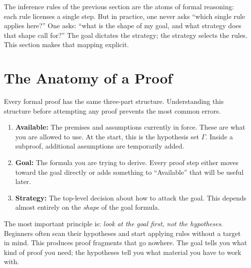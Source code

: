 The inference rules of the previous section are the atoms of formal reasoning:
each rule licenses a single step. But in practice, one never asks ``which
single rule applies here?'' One asks: ``what is the shape of my goal, and what
strategy does that shape call for?'' The goal dictates the strategy; the
strategy selects the rules. This section makes that mapping explicit.


\section*{The Anatomy of a Proof}

Every formal proof has the same three-part structure. Understanding this
structure before attempting any proof prevents the most common errors.

\begin{tcolorbox}[colback=propbox, colframe=propborder, arc=2pt,
  left=6pt, right=6pt, top=4pt, bottom=4pt,
  title={\small\textbf{The Three-Part Structure of a Proof}},
  fonttitle=\small\bfseries]
\begin{enumerate}[label=(\roman*)]
\item \textbf{Available:} The premises and assumptions currently in force.
  These are what you are allowed to use. At the start, this is the hypothesis
  set $\Gamma$. Inside a subproof, additional assumptions are temporarily added.
\item \textbf{Goal:} The formula you are trying to derive. Every proof step
  either moves toward the goal directly or adds something to ``Available'' that
  will be useful later.
\item \textbf{Strategy:} The top-level decision about how to attack the goal.
  This depends almost entirely on the \emph{shape} of the goal formula.
\end{enumerate}
\end{tcolorbox}

The most important principle is: \emph{look at the goal first, not the
hypotheses}. Beginners often scan their hypotheses and start applying rules
without a target in mind. This produces proof fragments that go nowhere. The
goal tells you what kind of proof you need; the hypotheses tell you what
material you have to work with.


